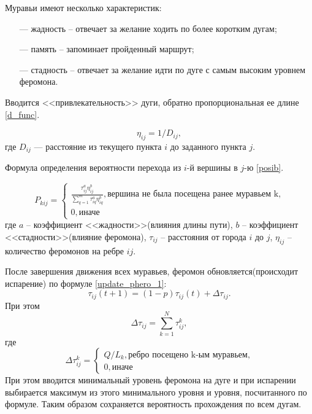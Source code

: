 \documentclass{bmstu}
\begin{document}
Муравьи имеют несколько характеристик:
\begin{itemize}
	\item [---] жадность -- отвечает за желание ходить по более коротким дугам;
	\item [---] память -- запоминает пройденный маршрут;
	\item [---] стадность -- отвечает за желание идти по дуге с самым высоким уровнем феромона.
\end{itemize}


Вводится <<привлекательность>> дуги, обратно пропорциональная ее длине \eqref{d_func}.

\begin{equation}
	\label{d_func}
	\eta_{ij} = 1 / D_{ij},
\end{equation}
где $D_{ij}$ — расстояние из текущего пункта $i$ до заданного пункта $j$.

Формула определения вероятности перехода из $i$-й вершины в $j$-ю \eqref{posib}.

\begin{equation}
	\label{posib}
	P_{kij} = \begin{cases}
		\frac{\tau_{ij}^a\eta_{ij}^b}{\sum_{q=1}^m \tau^a_{iq}\eta^b_{iq}}, \textrm{вершина не была посещена ранее муравьем k,} \\
		0, \textrm{иначе}
	\end{cases}
\end{equation}
где $a$ -- коэффициент <<жадности>>(влияния длины пути), $b$ -- коэффициент <<стадности>>(влияние феромона), $\tau_{ij}$ -- расстояния от города $i$ до $j$, $\eta_{ij}$ -- количество феромонов на ребре $ij$.

После завершения движения всех муравьев, феромон обновляется(происходит испарение) по формуле \eqref{update_phero_1}:
\begin{equation}
	\label{update_phero_1}
		\tau_{ij}(t+1) = (1-p)\tau_{ij}(t) + \Delta \tau_{ij}.
\end{equation}
При этом
\begin{equation}
\label{update_phero_2}
 \Delta \tau_{ij} = \sum_{k=1}^N \tau^k_{ij},
\end{equation}
где
\begin{equation}
	\label{update_phero_3}
		 \Delta\tau^k_{ij} = \begin{cases}
		Q/L_{k}, \textrm{ребро посещено k-ым муравьем,} \\
		0, \textrm{иначе}
	\end{cases}
\end{equation}
При этом вводится минимальный уровень феромона на дуге и при испарении выбирается максимум из этого минимального уровня и уровня, посчитанного по формуле. Таким образом сохраняется вероятность прохождения по всем дугам.
\end{document}
